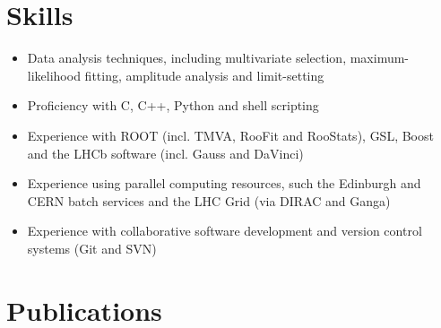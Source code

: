 \documentclass{simplecv}
\begin{document}
	\section{Skills}
	\begin{itemize}
		\itemsep-0.3em
		\item Data analysis techniques, including multivariate selection, maximum-likelihood fitting, amplitude analysis and limit-setting
		\item Proficiency with C, C++, Python and shell scripting
		\item Experience with ROOT (incl. TMVA, RooFit and RooStats), GSL, Boost and the LHCb software (incl. Gauss and DaVinci)
		\item Experience using parallel computing resources, such the Edinburgh and CERN batch services and the LHC Grid (via DIRAC and Ganga)
		\item Experience with collaborative software development and version control systems (Git and SVN)
	\end{itemize}
	\section{Publications}
\end{document}
